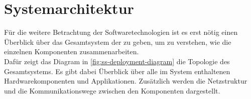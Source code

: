 \chapter{Systemarchitektur}
\label{chap:systemarchitektur}

Für die weitere Betrachtung der Softwaretechnologien ist es erst nötig einen Überblick über 
das Gesamtsystem der \shst{} zu geben, um zu verstehen, wie die einzelnen Komponenten
zusammenarbeiten.\\
Dafür zeigt das Diagram in \autoref{fig:ss-deployment-diagram} die Topologie des Gesamtsystems.
Es gibt dabei Überblick über alle im System enthaltenen Hardwarekomponenten und Applikationen.
Zusätzlich werden die Netzstruktur und die Kommunikationswege zwischen den Komponenten 
dargestellt.\\

